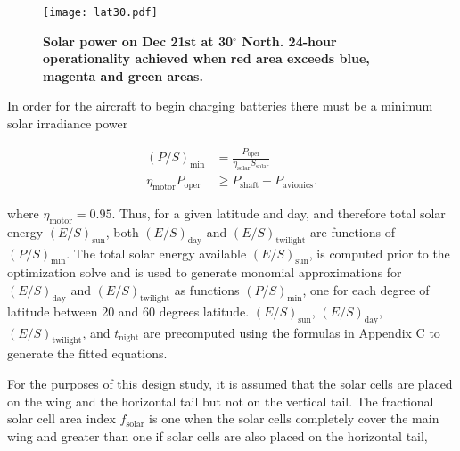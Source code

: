 \begin{figure}[h!]
	\begin{center}
	\texttt{[image: lat30.pdf]}
    \caption{\textbf{Solar power on Dec 21st at 30$^{\circ}$ North. 24-hour operationality achieved when red area exceeds blue, magenta and green areas. }}
	\label{f:lat30}
	\end{center}
\end{figure}

In order for the aircraft to begin charging batteries there must be a minimum solar irradiance power

\begin{align}
    (P/S)_{\text{min}} &= \frac{P_{\text{oper}}}{\eta_{\text{solar}} S_{\text{solar}}} \\
    \eta_{\text{motor}} P_{\text{oper}} &\geq P_{\text{shaft}} + P_{\text{avionics}}.
\end{align}

where $\eta_{\text{motor}} = 0.95$. 
Thus, for a given latitude and day, and therefore total solar energy $(E/S)_{\text{sun}}$, both $(E/S)_{\text{day}}$ and $(E/S)_{\text{twilight}}$ are functions of $(P/S)_{\text{min}}$.  
The total solar energy available $(E/S)_{\text{sun}}$, is computed prior to the optimization solve and is used to generate monomial approximations for $(E/S)_{\text{day}}$ and $(E/S)_{\text{twilight}}$ as functions $(P/S)_{\text{min}}$, one for each degree of latitude between 20 and 60 degrees latitude. 
$(E/S)_{\text{sun}}$, $(E/S)_{\text{day}}$, $(E/S)_{\text{twilight}}$, and $t_{\text{night}}$ are precomputed using the formulas in Appendix C to generate the fitted equations. 
% 


For the purposes of this design study, it is assumed that the solar cells are placed on the wing and the horizontal tail but not on the vertical tail. 
The fractional solar cell area index $f_{\text{solar}}$ is one when the solar cells completely cover the main wing and greater than one if solar cells are also placed on the horizontal tail,

